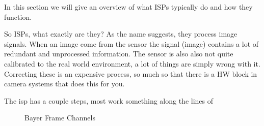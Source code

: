 In this section we will give an overview of what ISPs typically do and how they
function.

So ISPs, what exactly are they? As the name suggests, they process image
signals. When an image come from the sensor the signal (image) contains a lot
of redundant and unprocessed information. The sensor is also also not quite
calibrated to the real world environment, a lot of things are simply wrong with
it. Correcting these is an expensive process, so much so that there is a HW
block in camera systems that does this for you.

The isp has a couple steps, most work something along the lines of

\begin{figure}[htpb]
    \centering
    \qquad

    \qquad
    \qquad

    \caption[Bayer frame channels]{Bayer Frame Channels\footnotemark}
    \label{fig:bayer_channels}
\end{figure}

